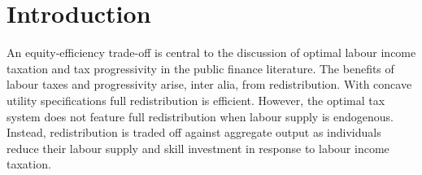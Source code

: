 \section{Introduction}





% 

\begin{comment}
\textcolor{violet}{Still to do:
\begin{itemize}
	\item possibilities to model technical change: substitutability of goods, growth in sector, innovation on substitutability versus consumption growth
\end{itemize}
}

content...
\end{comment}

An equity-efficiency trade-off is central to the discussion of optimal labour income taxation and tax progressivity in the public finance literature.  The benefits of labour taxes and progressivity arise, inter alia, from redistribution. %
With concave utility specifications full redistribution is efficient. However, the optimal tax system does not feature full redistribution when labour supply is endogenous. Instead, redistribution is traded off against aggregate output as individuals reduce their labour supply and skill investment in response to labour income taxation. 

